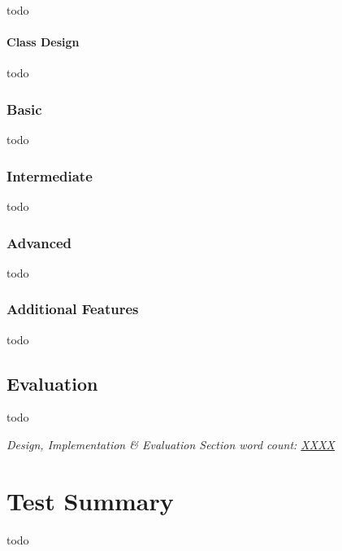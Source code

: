 \documentclass[letterpaper,12pt]{article}
\begin{document}
todo

\paragraph{Class Design}

todo


\subsubsection{Basic}

todo


\subsubsection{Intermediate}

todo


\subsubsection{Advanced}

todo


\subsubsection{Additional Features}

todo


\subsection{Evaluation}
\label{sec:evaluation}

todo

\textit{Design, Implementation \& Evaluation Section word count: \underline{XXXX}}

\section{Test Summary}
\label{sec:test-summary}

todo
\end{document}
